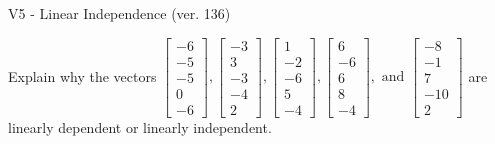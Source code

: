 \begin{exercise}
  \begin{exerciseTitle}V5 - Linear Independence (ver. 136)\end{exerciseTitle}
  \begin{exerciseStatement}
    Explain why the vectors \(\left[\begin{array}{r}
-6 \\
-5 \\
-5 \\
0 \\
-6
\end{array}\right] , \left[\begin{array}{r}
-3 \\
3 \\
-3 \\
-4 \\
2
\end{array}\right] , \left[\begin{array}{r}
1 \\
-2 \\
-6 \\
5 \\
-4
\end{array}\right] , \left[\begin{array}{r}
6 \\
-6 \\
6 \\
8 \\
-4
\end{array}\right] , \text{ and } \left[\begin{array}{r}
-8 \\
-1 \\
7 \\
-10 \\
2
\end{array}\right]\) are linearly dependent or linearly independent.	



\end{exerciseStatement}
\end{exercise}
